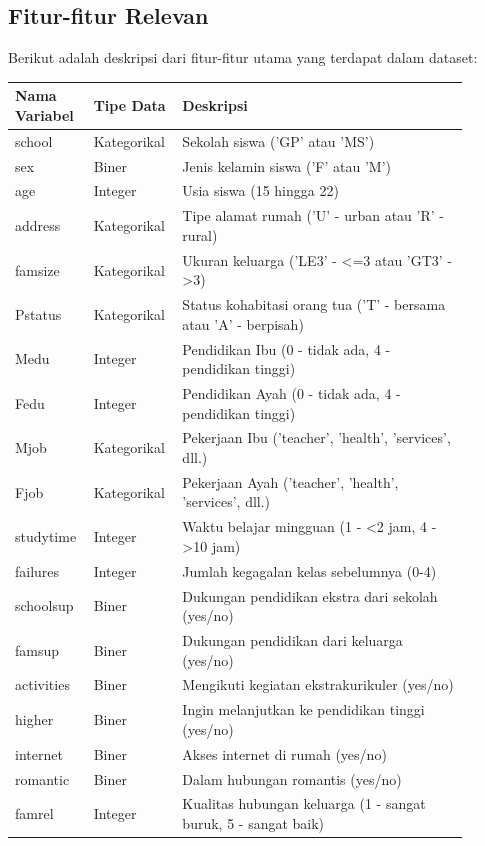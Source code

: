 \subsection{Fitur-fitur Relevan}
Berikut adalah deskripsi dari fitur-fitur utama yang terdapat dalam dataset:
\begin{longtable}{|p{0.15\linewidth}|p{0.15\linewidth}|p{0.6\linewidth}|}
    \hline
    \textbf{Nama Variabel} & \textbf{Tipe Data} & \textbf{Deskripsi} \\
    \hline
    \endhead
    school & Kategorikal & Sekolah siswa ('GP' atau 'MS') \\
    sex & Biner & Jenis kelamin siswa ('F' atau 'M') \\
    age & Integer & Usia siswa (15 hingga 22) \\
    address & Kategorikal & Tipe alamat rumah ('U' - urban atau 'R' - rural) \\
    famsize & Kategorikal & Ukuran keluarga ('LE3' - <=3 atau 'GT3' - >3) \\
    Pstatus & Kategorikal & Status kohabitasi orang tua ('T' - bersama atau 'A' - berpisah) \\
    Medu & Integer & Pendidikan Ibu (0 - tidak ada, 4 - pendidikan tinggi) \\
    Fedu & Integer & Pendidikan Ayah (0 - tidak ada, 4 - pendidikan tinggi) \\
    Mjob & Kategorikal & Pekerjaan Ibu ('teacher', 'health', 'services', dll.) \\
    Fjob & Kategorikal & Pekerjaan Ayah ('teacher', 'health', 'services', dll.) \\
    studytime & Integer & Waktu belajar mingguan (1 - <2 jam, 4 - >10 jam) \\
    failures & Integer & Jumlah kegagalan kelas sebelumnya (0-4) \\
    schoolsup & Biner & Dukungan pendidikan ekstra dari sekolah (yes/no) \\
    famsup & Biner & Dukungan pendidikan dari keluarga (yes/no) \\
    activities & Biner & Mengikuti kegiatan ekstrakurikuler (yes/no) \\
    higher & Biner & Ingin melanjutkan ke pendidikan tinggi (yes/no) \\
    internet & Biner & Akses internet di rumah (yes/no) \\
    romantic & Biner & Dalam hubungan romantis (yes/no) \\
    famrel & Integer & Kualitas hubungan keluarga (1 - sangat buruk, 5 - sangat baik) \\

\end{longtable}
